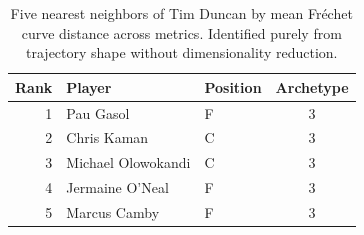 \begin{table}[htbp]
  \centering\small
  \begin{tabular}{rllc}
    \toprule
    Rank & Player & Position & Archetype \\
    \midrule
    1 & Pau Gasol & F & 3 \\
    2 & Chris Kaman & C & 3 \\
    3 & Michael Olowokandi & C & 3 \\
    4 & Jermaine O'Neal & F & 3 \\
    5 & Marcus Camby & F & 3 \\
    \bottomrule
  \end{tabular}
  \caption{Five nearest neighbors of Tim Duncan by mean Fr\'{e}chet curve distance across metrics. Identified purely from trajectory shape without dimensionality reduction.}
  \label{tab:Tim_Duncan_frechet_curve_neighbors}
\end{table}

